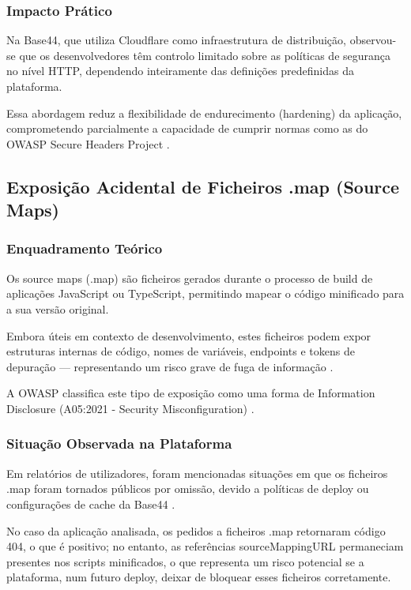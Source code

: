 \subsubsection{Impacto Prático}

Na Base44, que utiliza Cloudflare como infraestrutura de distribuição, observou-se que os desenvolvedores têm controlo limitado sobre as políticas de segurança no nível HTTP, dependendo inteiramente das definições predefinidas da plataforma.

Essa abordagem reduz a flexibilidade de endurecimento (hardening) da aplicação, comprometendo parcialmente a capacidade de cumprir normas como as do OWASP Secure Headers Project \cite{ref19}.

\subsection{Exposição Acidental de Ficheiros .map (Source Maps)}

\subsubsection{Enquadramento Teórico}

Os source maps (.map) são ficheiros gerados durante o processo de build de aplicações JavaScript ou TypeScript, permitindo mapear o código minificado para a sua versão original.

Embora úteis em contexto de desenvolvimento, estes ficheiros podem expor estruturas internas de código, nomes de variáveis, endpoints e tokens de depuração — representando um risco grave de fuga de informação \cite{ref20}.

A OWASP classifica este tipo de exposição como uma forma de Information Disclosure (A05:2021 - Security Misconfiguration) \cite{ref21}.

\subsubsection{Situação Observada na Plataforma}

Em relatórios de utilizadores, foram mencionadas situações em que os ficheiros .map foram tornados públicos por omissão, devido a políticas de deploy ou configurações de cache da Base44 \cite{ref22}.

No caso da aplicação analisada, os pedidos a ficheiros .map retornaram código 404, o que é positivo; no entanto, as referências sourceMappingURL permaneciam presentes nos scripts minificados, o que representa um risco potencial se a plataforma, num futuro deploy, deixar de bloquear esses ficheiros corretamente.

